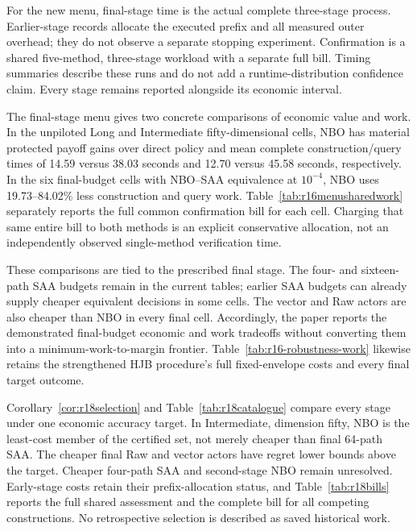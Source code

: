 For the new menu, final-stage time is the actual complete three-stage process. Earlier-stage records allocate the executed prefix and all measured outer overhead; they do not observe a separate stopping experiment. Confirmation is a shared five-method, three-stage workload with a separate full bill. Timing summaries describe these runs and do not add a runtime-distribution confidence claim. Every stage remains reported alongside its economic interval.

The final-stage menu gives two concrete comparisons of economic value and work. In the unpiloted Long and Intermediate fifty-dimensional cells, NBO has material protected payoff gains over direct policy and mean complete construction/query times of 14.59 versus 38.03 seconds and 12.70 versus 45.58 seconds, respectively. In the six final-budget cells with NBO--SAA equivalence at $10^{-4}$, NBO uses 19.73--84.02\% less construction and query work. Table~\ref{tab:r16menusharedwork} separately reports the full common confirmation bill for each cell. Charging that same entire bill to both methods is an explicit conservative allocation, not an independently observed single-method verification time.

These comparisons are tied to the prescribed final stage. The four- and sixteen-path SAA budgets remain in the current tables; earlier SAA budgets can already supply cheaper equivalent decisions in some cells. The vector and Raw actors are also cheaper than NBO in every final cell. Accordingly, the paper reports the demonstrated final-budget economic and work tradeoffs without converting them into a minimum-work-to-margin frontier. Table~\ref{tab:r16-robustness-work} likewise retains the strengthened HJB procedure's full fixed-envelope costs and every final target outcome.


Corollary~\ref{cor:r18selection} and Table~\ref{tab:r18catalogue} compare every stage under one economic accuracy target. In Intermediate, dimension fifty, NBO is the least-cost member of the certified set, not merely cheaper than final 64-path SAA. The cheaper final Raw and vector actors have regret lower bounds above the target. Cheaper four-path SAA and second-stage NBO remain unresolved. Early-stage costs retain their prefix-allocation status, and Table~\ref{tab:r18bills} reports the full shared assessment and the complete bill for all competing constructions. No retrospective selection is described as saved historical work.

